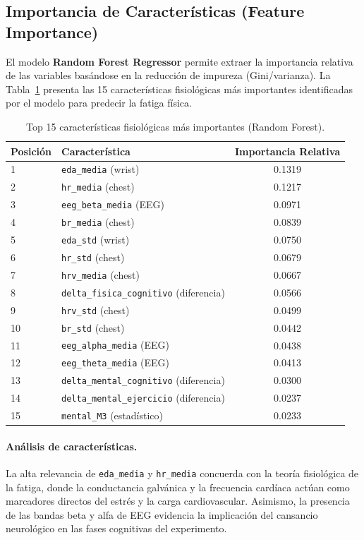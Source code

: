 \documentclass[12pt, a4paper]{article}
\newcommand{\code}[1]{\texttt{#1}}
\begin{document}
\subsection{Importancia de Características (Feature Importance)}

El modelo \textbf{Random Forest Regressor} permite extraer la importancia relativa de las variables basándose en la reducción de impureza (Gini/varianza). La Tabla~\ref{tab:importancia_features} presenta las 15 características fisiológicas más importantes identificadas por el modelo para predecir la fatiga física.

\begin{table}[H]
\centering
\caption{Top 15 características fisiológicas más importantes (Random Forest).}
\label{tab:importancia_features}
\small
\begin{tabular}{@{}llc@{}}
\toprule
\textbf{Posición} & \textbf{Característica} & \textbf{Importancia Relativa} \\
\midrule
1 & \code{eda\_media} (wrist) & 0.1319 \\
2 & \code{hr\_media} (chest) & 0.1217 \\
3 & \code{eeg\_beta\_media} (EEG) & 0.0971 \\
4 & \code{br\_media} (chest) & 0.0839 \\
5 & \code{eda\_std} (wrist) & 0.0750 \\
6 & \code{hr\_std} (chest) & 0.0679 \\
7 & \code{hrv\_media} (chest) & 0.0667 \\
8 & \code{delta\_fisica\_cognitivo} (diferencia) & 0.0566 \\
9 & \code{hrv\_std} (chest) & 0.0499 \\
10 & \code{br\_std} (chest) & 0.0442 \\
11 & \code{eeg\_alpha\_media} (EEG) & 0.0438 \\
12 & \code{eeg\_theta\_media} (EEG) & 0.0413 \\
13 & \code{delta\_mental\_cognitivo} (diferencia) & 0.0300 \\
14 & \code{delta\_mental\_ejercicio} (diferencia) & 0.0237 \\
15 & \code{mental\_M3} (estadístico) & 0.0233 \\
\bottomrule
\end{tabular}
\end{table}

\paragraph{Análisis de características.}
La alta relevancia de \code{eda\_media} y \code{hr\_media} concuerda con la teoría fisiológica de la fatiga, donde la conductancia galvánica y la frecuencia cardíaca actúan como marcadores directos del estrés y la carga cardiovascular. Asimismo, la presencia de las bandas beta y alfa de EEG evidencia la implicación del cansancio neurológico en las fases cognitivas del experimento.
\end{document}
